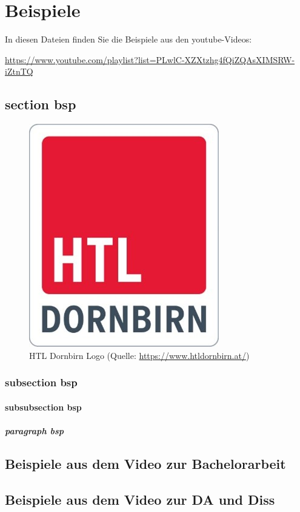 \chapter{Beispiele}

In diesen Dateien finden Sie die Beispiele aus den youtube-Videos:

\url{https://www.youtube.com/playlist?list=PLwlC-XZXtzhg4fQiZQAsXIMSRW-iZtnTQ}

\section{section bsp}
\begin{figure}
	\centering
	\includegraphics[width=0.4\linewidth]{Bilder/HTL_Dornbirn_Logo}
	\caption[HTLlogo]{HTL Dornbirn Logo (Quelle: \url{https://www.htldornbirn.at/})}
	\label{fig:htldornbirnlogo}
\end{figure}


\subsection{subsection bsp}
\subsubsection{subsubsection bsp}
\paragraph{paragraph bsp}

\section{Beispiele aus dem Video zur Bachelorarbeit}
\setAuthor{\pezze}

\newpage
\section{Beispiele aus dem Video zur DA und Diss}
\setAuthor{\schneider}



